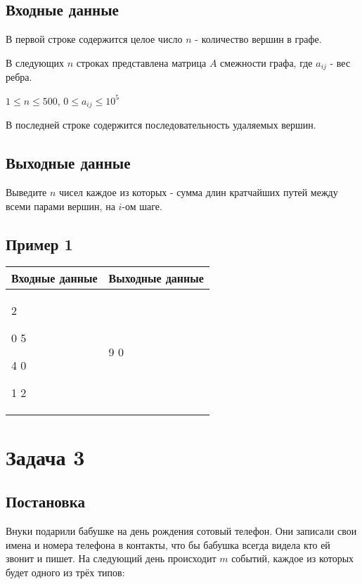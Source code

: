 \documentclass[a4]{article}
\begin{document}
\subsection*{Входные данные}
\label{sec:orgc51833b}
В первой строке содержится целое число $n$ - количество вершин в графе.

В следующих $n$ строках представлена матрица $A$ смежности графа, где $a_{ij}$ - вес ребра.

$1\leq n \leq 500$, $0\leq a_{ij} \leq 10^5$

В последней строке содержится последовательность удаляемых вершин.
\subsection*{Выходные данные}
\label{sec:orgf9da829}
Выведите $n$ чисел каждое из которых - сумма длин кратчайших путей между всеми парами вершин, на $i$-ом шаге. 


\subsection*{Пример 1}
\label{sec:orgd7d348d}

\begin{table}[H]
\begin{center}
\begin{tabular}{|m{4cm}|m{4cm}|}
\hline
Входные данные & Выходные данные \\ \hline
2 

0 5 

4 0

1 2

&
9 0
\\ \hline
\end{tabular}
\end{center}
\end{table}
\pagebreak
\section*{Задача 3}
\label{sec:org570b899}
\subsection*{Постановка}
\label{sec:orga2b5149}
Внуки подарили бабушке на день рождения сотовый телефон. Они записали свои имена и номера телефона в контакты, что бы бабушка всегда видела кто ей звонит и пишет. На следующий день происходит $m$ событий, каждое из которых будет одного из трёх типов:
\end{document}
